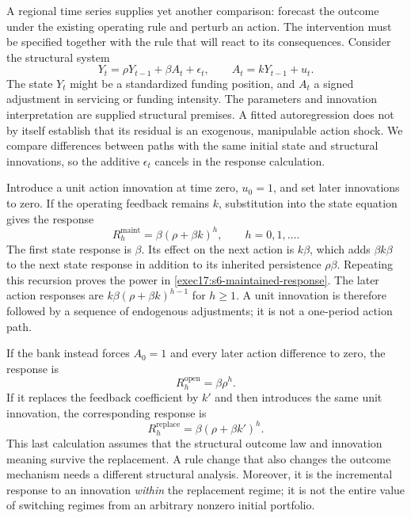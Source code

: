 A regional time series supplies yet another comparison: forecast the outcome
under the existing operating rule and perturb an action. The intervention must
be specified together with the rule that will react to its consequences.
Consider the structural system
\begin{equation}
 Y_t=\rho Y_{t-1}+\beta A_t+\epsilon_t,\qquad
 A_t=kY_{t-1}+u_t.
 \label{exec17:s6-feedback-law}
\end{equation}
The state $Y_t$ might be a standardized funding position, and $A_t$ a
signed adjustment in servicing or funding intensity. The parameters and
innovation interpretation are supplied structural premises. A fitted
autoregression does not by itself establish that its residual is an
exogenous, manipulable action shock. We compare differences between paths
with the same initial state and structural innovations, so the additive
$\epsilon_t$ cancels in the response calculation.

Introduce a unit action innovation at time zero, $u_0=1$, and set later
innovations to zero. If the operating feedback remains $k$, substitution
into the state equation gives the response
\begin{equation}
 R_h^{\mathrm{maint}}=\beta(\rho+\beta k)^h,
 \qquad h=0,1,\ldots.
 \label{exec17:s6-maintained-response}
\end{equation}
The first state response is $\beta$. Its effect on the next action is
$k\beta$, which adds $\beta k\beta$ to the next state response in
addition to its inherited persistence $\rho\beta$. Repeating this
recursion proves the power in \eqref{exec17:s6-maintained-response}.
The later action responses are $k\beta(\rho+\beta k)^{h-1}$ for
$h\geq1$. A unit innovation is therefore followed by a sequence of
endogenous adjustments; it is not a one-period action path.

If the bank instead forces $A_0=1$ and every later action difference to
zero, the response is
\begin{equation}
 R_h^{\mathrm{open}}=\beta\rho^h.
 \label{exec17:s6-open-response}
\end{equation}
If it replaces the feedback coefficient by $k'$ and then introduces the
same unit innovation, the corresponding response is
\begin{equation}
 R_h^{\mathrm{replace}}=\beta(\rho+\beta k')^h.
 \label{exec17:s6-replacement-response}
\end{equation}
This last calculation assumes that the structural outcome law and innovation
meaning survive the replacement. A rule change that also changes the outcome
mechanism needs a different structural analysis. Moreover, it is the
incremental response to an innovation \emph{within} the replacement regime;
it is not the entire value of switching regimes from an arbitrary nonzero
initial portfolio.

